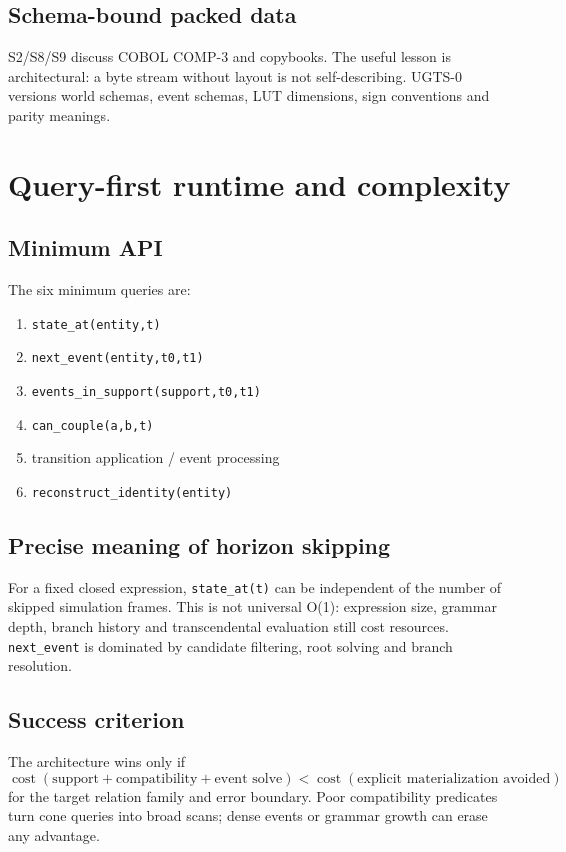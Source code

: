 \documentclass[10.5pt,a4paper,openany]{book}
\newcommand{\code}[1]{\texttt{#1}}
\begin{document}
\section{Schema-bound packed data}
S2/S8/S9 discuss COBOL COMP-3 and copybooks. The useful lesson is architectural: a byte stream without layout is not self-describing. UGTS-0 versions world schemas, event schemas, LUT dimensions, sign conventions and parity meanings.

\chapter{Query-first runtime and complexity}
\section{Minimum API}
The six minimum queries are:
\begin{enumerate}
\item \code{state\_at(entity,t)}
\item \code{next\_event(entity,t0,t1)}
\item \code{events\_in\_support(support,t0,t1)}
\item \code{can\_couple(a,b,t)}
\item transition application / event processing
\item \code{reconstruct\_identity(entity)}
\end{enumerate}

\section{Precise meaning of horizon skipping}
For a fixed closed expression, \code{state\_at(t)} can be independent of the number of skipped simulation frames. This is not universal O(1): expression size, grammar depth, branch history and transcendental evaluation still cost resources. \code{next\_event} is dominated by candidate filtering, root solving and branch resolution.

\section{Success criterion}
The architecture wins only if
\[
\operatorname{cost}(\text{support}+\text{compatibility}+\text{event solve})
<\operatorname{cost}(\text{explicit materialization avoided})
\]
for the target relation family and error boundary. Poor compatibility predicates turn cone queries into broad scans; dense events or grammar growth can erase any advantage.
\end{document}
